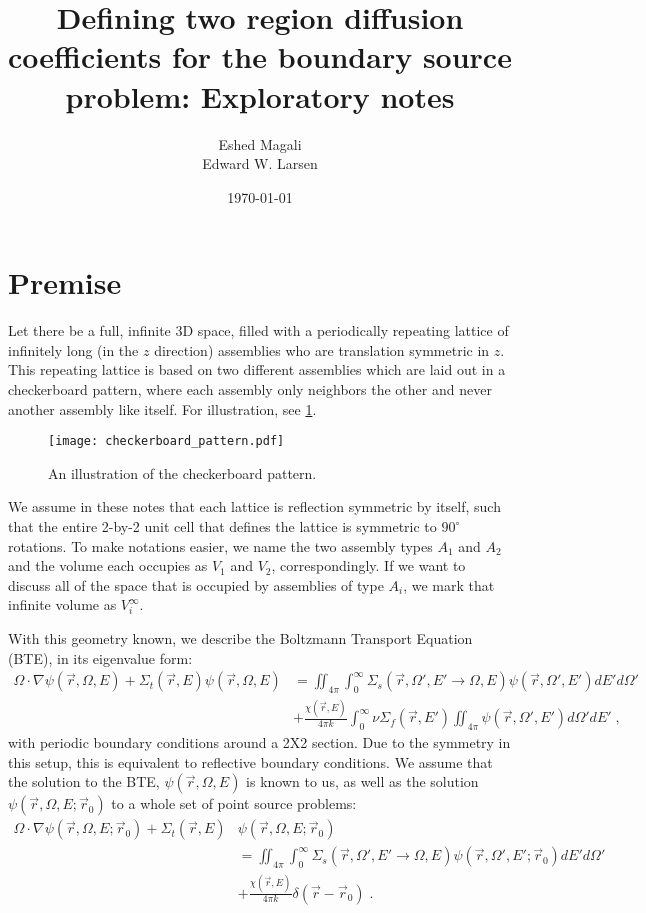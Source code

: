 \documentclass[a4paper,letterpaper,12pt,oneside,draft]{article}
\title{Defining two region diffusion coefficients for the boundary source problem: Exploratory notes}
\author{Eshed Magali \\ Edward W. Larsen}
\date{\today}
\newcommand{\eec}{\;,}
\newcommand{\eep}{\;.}
\newcommand{\vr}{\ensuremath{\vec{r}}}
\newcommand{\dvr}{\left(\vr-\vr_0\right)}
\newcommand{\psif}[1][]{\psi(\vr,\Omega#1,E#1)}
\newcommand{\psifz}[1][]{\psi(\vr,\Omega#1,E#1;\vr_0)}
\begin{document}
\maketitle

\section{Premise}\label{sec:premise}
    Let there be a full, infinite 3D space, filled with a periodically repeating lattice of infinitely long (in the $z$ direction) assemblies who are translation symmetric in $z$. 
    This repeating lattice is based on two different assemblies which are laid out in a checkerboard pattern, where each assembly only neighbors the other and never another assembly like itself. 
    For illustration, see \cref{fig:checkerboard:transport}.
    \begin{figure}[H]
        \centering
        \texttt{[image: checkerboard\_pattern.pdf]}
        \caption{An illustration of the checkerboard pattern.}\label{fig:checkerboard:transport}
    \end{figure}

    We assume in these notes that each lattice is reflection symmetric by itself, such that the entire 2-by-2 unit cell that defines the lattice is symmetric to $90^\circ$ rotations.
    To make notations easier, we name the two assembly types $A_1$ and $A_2$ and the volume each occupies as $V_1$ and $V_2$, correspondingly. If we want to discuss all of the space that is occupied by assemblies of type $A_i$, we mark that infinite volume as $V_i^\infty$.
    
    With this geometry known, we describe the Boltzmann Transport Equation (BTE), in its eigenvalue form:
    \begin{align}
    \label{eq:BTE}
        \Omega\cdot\nabla\psif + \Sigma_{t}(\vr,E)\psif &= \iint_{4\pi}\int_{0}^{\infty}\Sigma_{s}(\vr,\Omega',E'\to \Omega,E)\psif[']dE'd\Omega' \\\nonumber
        &+ \frac{\chi(\vr,E)} {4\pi k} \int_{0}^{\infty} \nu\Sigma_{f}(\vr,E') \iint_{4\pi}\psif[']d\Omega'dE' \eec
    \end{align}
    with periodic boundary conditions around a 2X2 section. Due to the symmetry in this setup, this is equivalent to reflective boundary conditions.
    We assume that the solution to the BTE, $\psif$ is known to us, as well as the solution $\psifz$ to a whole set of point source problems:
    \begin{align}
    \label{eq:BTE:PS}
        \Omega\cdot\nabla\psifz + \Sigma_{t}(\vr,E)&\psifz \\\nonumber
        &=\iint_{4\pi}\int_{0}^{\infty}\Sigma_{s}(\vr,\Omega',E'\to \Omega,E)\psifz[']dE'd\Omega' \\\nonumber
        &+ \frac{\chi(\vr,E)} {4\pi k} \delta\dvr \eep
    \end{align}
    
\end{document}
